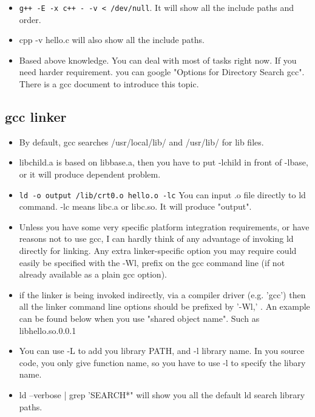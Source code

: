 \documentclass[a4paper,12pt,twoside]{book}
\begin{document}
\begin{itemize}
\begin{itemize}
\begin{itemize}
		\item \verb=g++ -E -x c++ - -v < /dev/null=. It will show all the include paths and order. 

		\item cpp -v hello.c will also show all the include paths. 

		\item Based above knowledge. You can deal with most of tasks right now. If you need harder requirement. you can google "Options for Directory Search gcc". There is a gcc document to introduce this topic. 
		
			\end{itemize}

\subsection{gcc linker}
			 \begin{itemize}
			 \item By default, gcc searches /usr/local/lib/ and /usr/lib/ for lib files.
			 
			 \item libchild.a is based on libbase.a, then you have to put -lchild in front of -lbase, or it will produce dependent problem. 
			 
			\item \verb=ld -o output /lib/crt0.o hello.o -lc= You can input .o file directly to ld command. -lc means libc.a or libc.so. It will produce "output". 
					 
			\item Unless you have some very specific platform integration requirements, or have reasons not to use gcc, I can hardly think of any advantage of invoking ld directly for linking. Any extra linker-specific option you may require could easily be specified with the -Wl, prefix on the gcc command line (if not already available as a plain gcc option).

			 \item if the linker is being invoked indirectly, via a compiler driver (e.g. 'gcc') then all the linker command line options should be prefixed by '-Wl,' . An example can be found below when you use "shared object name". Such as libhello.so.0.0.1

    \item You can use -L to add you library PATH, and -l library name. In you source code, you only give function name, so you have to use -l to specify the libary name. 

	\item ld --verbose | grep 'SEARCH*" will show you all the default ld search library paths.
			

\end{itemize}
\end{itemize}
\end{itemize}
\end{document}
